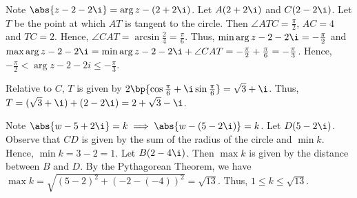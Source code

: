 \begin{solution}
\begin{center}
    \end{center}

    \begin{ppart}
        Note $\abs{z - 2 - 2\i} = \arg{z - (2 + 2\i)}$. Let $A(2 + 2\i)$ and $C(2 - 2\i)$. Let $T$ be the point at which $AT$ is tangent to the circle. Then $\angle ATC = \frac\pi2$, $AC = 4$ and $TC = 2$. Hence, $\angle CAT = \arcsin \frac24 = \frac\pi6$. Thus, $\min \arg{z - 2 - 2\i} = -\frac\pi2$ and $\max \arg{z - 2 - 2\i} = \min \arg{z - 2 - 2\i} + \angle CAT = -\frac\pi2 + \frac\pi6 = -\frac\pi3$. Hence, $-\frac\pi2 < \arg{z - 2 - 2i} \leq -\frac\pi3$.
    \end{ppart}
    \begin{ppart}
        Relative to $C$, $T$ is given by $2 \bp{\cos \frac\pi6 + \i\sin \frac\pi6} = \sqrt3 + \i$. Thus, $T = (\sqrt 3 + \i) + (2 - 2\i) = 2 + \sqrt3 - \i$.
    \end{ppart}

    Note $\abs{w - 5 + 2\i} = k \implies \abs{w - (5 - 2\i)} = k$. Let $D(5 - 2\i)$. Observe that $CD$ is given by the sum of the radius of the circle and $\min k$. Hence, $\min k = 3 - 2 = 1$. Let $B(2 - 4\i)$. Then $\max k$ is given by the distance between $B$ and $D$. By the Pythagorean Theorem, we have $\max k = \sqrt{(5-2)^2 + (-2-(-4))^2} = \sqrt{13}$. Thus, $1 \leq k \leq \sqrt{13}$.
\end{solution}